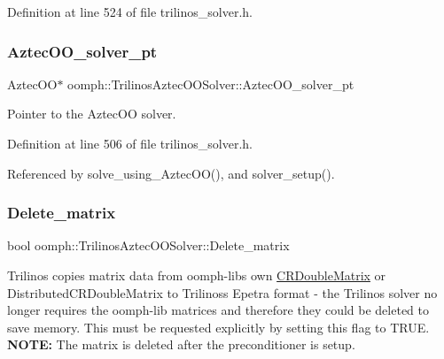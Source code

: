 Definition at line 524 of file trilinos\+\_\+solver.\+h.

\mbox{\label{classoomph_1_1TrilinosAztecOOSolver_ad71b280c5af25e35e0f9da8cd68228cf}} 
\subsubsection{\texorpdfstring{Aztec\+O\+O\+\_\+solver\+\_\+pt}{AztecOO\_solver\_pt}}
{\footnotesize\ttfamily Aztec\+OO$\ast$ oomph\+::\+Trilinos\+Aztec\+O\+O\+Solver\+::\+Aztec\+O\+O\+\_\+solver\+\_\+pt\hspace{0.3cm}{\ttfamily [protected]}}



Pointer to the Aztec\+OO solver. 



Definition at line 506 of file trilinos\+\_\+solver.\+h.



Referenced by solve\+\_\+using\+\_\+\+Aztec\+O\+O(), and solver\+\_\+setup().

\mbox{\label{classoomph_1_1TrilinosAztecOOSolver_a6cd6d4719412c7ebf01bfb6cb4fddfcc}} 
\subsubsection{\texorpdfstring{Delete\+\_\+matrix}{Delete\_matrix}}
{\footnotesize\ttfamily bool oomph\+::\+Trilinos\+Aztec\+O\+O\+Solver\+::\+Delete\+\_\+matrix\hspace{0.3cm}{\ttfamily [protected]}}



Trilinos copies matrix data from oomph-\/lib\textquotesingle{}s own \hyperlink{classoomph_1_1CRDoubleMatrix}{C\+R\+Double\+Matrix} or Distributed\+C\+R\+Double\+Matrix to Trilinos\textquotesingle{}s Epetra format -\/ the Trilinos solver no longer requires the oomph-\/lib matrices and therefore they could be deleted to save memory. This must be requested explicitly by setting this flag to T\+R\+UE. {\bfseries N\+O\+TE\+:} The matrix is deleted after the preconditioner is setup. 



